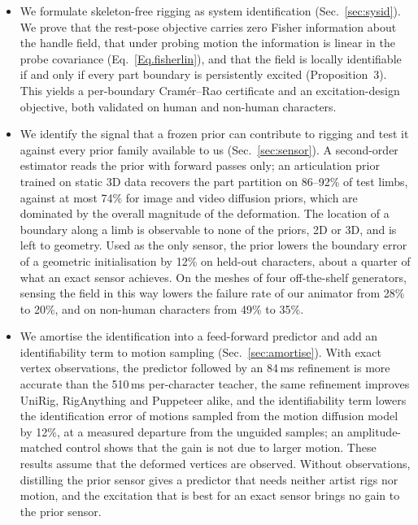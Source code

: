 \documentclass[lettersize,journal]{IEEEtran}
\newcommand{\rev}[1]{{\color{red}#1}}
\begin{document}
\begin{itemize}
{(Table~\ref{table:interaction}). The mesh post-processing interacts with the animator as well:
it lowers the failure rate of our animator on the meshes of all four generators tested and
improves none of three other animators consistently (Table~\ref{table:postproc}).}
\item \rev{We formulate skeleton-free rigging as system identification
(Sec.~\ref{sec:sysid}). We prove that the rest-pose objective carries zero Fisher information
about the handle field, that under probing motion the information is linear in the probe
covariance (Eq.~\ref{Eq.fisherlin}), and that the field is locally identifiable if and only if
every part boundary is persistently excited (Proposition~3). This yields a
per-boundary Cram\'er--Rao certificate and an excitation-design objective, both validated on
human and non-human characters.}
\item \rev{We identify the signal that a frozen prior can contribute to rigging and test it
against every prior family available to us (Sec.~\ref{sec:sensor}). A second-order estimator
reads the prior with forward passes only; an articulation prior trained on static 3D data
recovers the part partition on 86--92\% of test limbs, against at most 74\% for image and video
diffusion priors, which are dominated by the overall magnitude of the deformation. The location
of a boundary along a limb is observable to none of the priors, 2D or 3D, and is left to
geometry. Used as the only sensor, the prior lowers the boundary error of a geometric
initialisation by 12\% on held-out characters, about a quarter of what an exact sensor achieves. On the meshes of four off-the-shelf
generators, sensing the field in this way lowers the failure rate of our animator from 28\% to
20\%, and on non-human characters from 49\% to 35\%.}
\item \rev{We amortise the identification into a feed-forward predictor and add an
identifiability term to motion sampling (Sec.~\ref{sec:amortise}). With exact vertex
observations, the predictor followed by an 84\,ms refinement is more accurate than the 510\,ms
per-character teacher, the same refinement improves UniRig, RigAnything and Puppeteer alike,
and the identifiability term lowers the identification error of motions sampled from the
motion diffusion model by 12\%, at a measured departure from the unguided samples; an
amplitude-matched control shows that the gain is not due to larger motion. These results assume
that the deformed vertices are observed. Without observations, distilling the prior sensor gives
a predictor that needs neither artist rigs nor motion, and the excitation that is best for an
exact sensor brings no gain to the prior sensor.}
\end{itemize}
\end{document}
